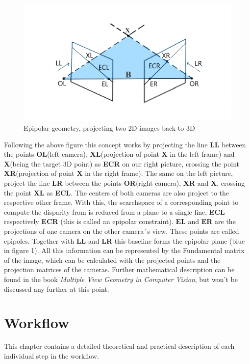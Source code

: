 \documentclass[journal,onecolumn]{IEEEtran}
\begin{document}
\begin{figure}[H]
	\centering
	\includegraphics[scale=0.5]{epipolarGeometry.png}
	\captionsetup{justification=centering}
	\caption{Epipolar geometry, projecting two 2D images back to 3D}
\end{figure}
\noindent
Following the above figure this concept works by projecting the line {\bf LL} between the points {\bf OL}(left camera), {\bf XL}(projection of point {\bf X} in the left frame) and {\bf X}(being the target 3D point) as {\bf ECR} on our right picture, crossing the point {\bf XR}(projection of point {\bf X} in the right frame). The same on the left picture, project the line {\bf LR} between the points {\bf OR}(right camera), {\bf XR} and {\bf X}, crossing the point {\bf XL} as {\bf ECL}. The centers of both cameras are also project to the respective other frame.
With this, the searchspace of a corresponding point to compute the disparity from is reduced from a plane to a single line, {\bf ECL} respectively {\bf ECR} (this is called an epipolar constraint). {\bf EL} and {\bf ER} are the projections of one camera on the other camera´s view. These points are called epipoles. Together with {\bf LL} and {\bf LR} this baseline forms the epipolar plane (blue in figure 1). All this information can be represented by the Fundamental matrix of the image, which can be calculated with the projected points and the projection matrices of the cameras. Further mathematical description can be found in the book \emph{Multiple View Geometry in Computer Vision}\cite{hartley_zisserman_2004}, but won't be discussed any further at this point.

\section{Workflow}
\noindent
This chapter contains a detailed theoretical and practical description of each individual step in the workflow.
\end{document}
